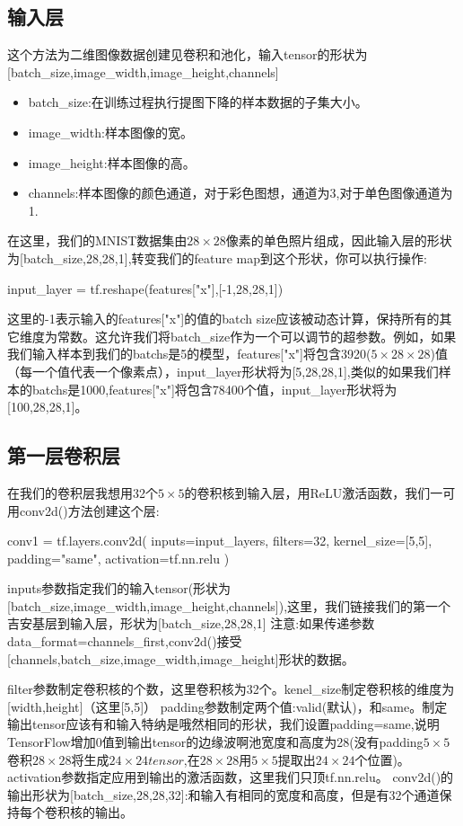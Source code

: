 \subsection{输入层}
 这个方法为二维图像数据创建见卷积和池化，输入tensor的形状为[batch\_size,image\_width,image\_height,channels]
\begin{itemize}
\item batch\_size:在训练过程执行提图下降的样本数据的子集大小。
\item image\_width:样本图像的宽。
\item image\_height:样本图像的高。
\item channels:样本图像的颜色通道，对于彩色图想，通道为3,对于单色图像通道为1.
\end{itemize}
在这里，我们的MNIST数据集由$28\times28$像素的单色照片组成，因此输入层的形状为[batch\_size,28,28,1],转变我们的feature map到这个形状，你可以执行操作:
\begin{python}
input_layer = tf.reshape(features["x"],[-1,28,28,1])
\end{python}
这里的-1表示输入的features["x"]的值的batch size应该被动态计算，保持所有的其它维度为常数。这允许我们将batch\_size作为一个可以调节的超参数。例如，如果我们输入样本到我们的batchs是5的模型，features["x"]将包含3920($5\times28\times28$)值（每一个值代表一个像素点），input\_layer形状将为[5,28,28,1],类似的如果我们样本的batchs是1000,features["x"]将包含78400个值，input\_layer形状将为[100,28,28,1]。
\subsection{第一层卷积层}
在我们的卷积层我想用32个$5\times5$的卷积核到输入层，用ReLU激活函数，我们一可用conv2d()方法创建这个层:
\begin{python}
conv1 = tf.layers.conv2d(
    inputs=input_layers,
    filters=32,
    kernel_size=[5,5],
    padding="same",
    activation=tf.nn.relu
)
\end{python}
\begin{displayquote}
inputs参数指定我们的输入tensor(形状为[batch\_size,image\_width,image\_height,channels]),这里，我们链接我们的第一个吉安基层到输入层，形状为[batch\_size,28,28,1]
注意:如果传递参数data\_format=channels\_first,conv2d()接受[channels,batch\_size,image\_width,image\_height]形状的数据。
\end{displayquote}
filter参数制定卷积核的个数，这里卷积核为32个。kenel\_size制定卷积核的维度为[width,height]（这里[5,5]）
padding参数制定两个值:valid(默认)，和same。制定输出tensor应该有和输入特纳是哦然相同的形状，我们设置padding=same,说明TensorFlow增加0值到输出tensor的边缘波啊池宽度和高度为28(没有padding$5\times5$卷积$28\times28$将生成$24\times24tensor$,在$28\times28$用$5\times5$提取出$24\times24$个位置)。
activation参数指定应用到输出的激活函数，这里我们只顶tf.nn.relu。
conv2d()的输出形状为[batch\_size,28,28,32]:和输入有相同的宽度和高度，但是有32个通道保持每个卷积核的输出。
